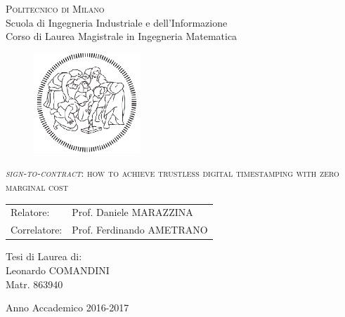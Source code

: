 \begin{titlepage}

	\begin{center}
		\normalsize 
			\textsc{Politecnico di Milano}\\
			Scuola di Ingegneria Industriale e dell'Informazione\\
      		Corso di Laurea Magistrale in Ingegneria Matematica\\
	\end{center}
	\vspace{.6cm}
	
	\begin{figure}[htpb]
		\centering
		\includegraphics[width=4cm]{Cover/polimi}
	\end{figure}
	\vspace{.6cm}
	
	\begin{center}
		\LARGE
			\textsc{\textit{sign-to-contract}: how to achieve trustless digital timestamping with zero marginal cost}
	\end{center}
	\vspace{1.6cm}

	\begin{flushleft}
		\large
		\begin{tabular}{ll}
		Relatore:    & Prof. Daniele MARAZZINA      \\
		Correlatore: & Prof. Ferdinando AMETRANO
		\end{tabular}
		\vspace{1cm}
	\end{flushleft}
	
	\begin{flushright}
		\large
		Tesi di Laurea di:\\
		Leonardo COMANDINI\\
		Matr. 863940\\		
	\end{flushright}
	
	\vspace*{\fill}
	\begin{center}
		Anno Accademico 2016-2017
	\end{center}
	
\end{titlepage}
